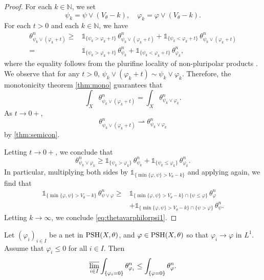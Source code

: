 \begin{proof}
    For each $k\in \mathbb{N}$, we set
    \[
    \psi_k=\psi\lor (V_{\theta}-k),\quad \varphi_k=\varphi\lor (V_{\theta}-k).
    \]
    For each $t>0$ and each $k\in \mathbb{N}$, we have
    \[
    \begin{split}
    \theta_{\psi_k\lor (\varphi_k+t)}^n\geq & \mathds{1}_{\{\psi_k>\varphi_k+t\}}\,\theta_{\psi_k\lor (\varphi_k+t)}^n+\mathds{1}_{\{\psi_k<\varphi_k+t\}}\,\theta_{\psi_k\lor (\varphi _k+t)}^n\\
    =&\mathds{1}_{\{\psi_k>\varphi_k+t\}}\,\theta_{\psi_k}^n+\mathds{1}_{\{\psi_k<\varphi_k+t\}}\,\theta_{\varphi_k}^n,
    \end{split}
    \]
    where the equality follows from the plurifine locality of non-pluripolar products . We observe that for any $t>0$, $\psi_k\lor (\varphi_k+t)\sim \psi_k\lor \varphi_k$. Therefore, the monotonicity theorem \cref{thm:mono} guarantees that
    \[
        \int_X \theta_{\psi_k\lor (\varphi_k+t)}^n=\int_X\theta_{\psi_k\lor \varphi_k}^n.
    \]
    As $t\to 0+$,
    \[
    \theta_{\psi_k\lor (\varphi_k+t)}^n\rightharpoonup \theta_{\psi_k\lor \varphi_k}^n
    \]
    by \cref{thm:semicon}.

    Letting $t\to 0+$, we conclude that
    \[
    \theta_{\psi_k\lor \varphi_k}^n\geq \mathds{1}_{\{\psi_k>\varphi_k\}}\,\theta_{\psi_k}^n+\mathds{1}_{\{\psi_k\leq \varphi_k\}}\,\theta_{\varphi_k}^n.
    \]
    In particular, multiplying both sides by $\mathds{1}_{\{\min\{\varphi,\psi\}>V_{\theta}-k\}}$ and applying  again, we find that
    \[
    \begin{split}
    \mathds{1}_{\{\min\{\varphi,\psi\}>V_{\theta}-k\}}\,\theta_{\psi\lor \varphi}^n\geq &\mathds{1}_{\{\min\{\varphi,\psi\}>V_{\theta}-k\}\cap \{\psi\leq \varphi\}}\,\theta_{\varphi}^n \\
    &+\mathds{1}_{\{\min\{\varphi,\psi\}>V_{\theta}-k\}\cap \{\psi>\varphi\}}\,\theta_{\psi}^n.
    \end{split}
    \]
    Letting $k\to\infty$, we conclude \eqref{eq:thetavarphilorpsi1}.
\end{proof}
\begin{corollary}\label{cor:intcontlimsup}
    Let $(\varphi_i)_{i\in I}$ be a net in $\mathrm{PSH}(X,\theta)$, and $\varphi\in \mathrm{PSH}(X,\theta)$ so that $\varphi_i\to \varphi$ in $L^1$. Assume that $\varphi_i\leq 0$ for all $i\in I$.
    Then
    \begin{equation}\label{eq:contact_int_usc}
    \varlimsup_{i\in I} \int_{\{\varphi_i=0\}}\theta_{\varphi_i}^n\leq \int_{\{\varphi=0\}} \theta_{\varphi}^n.
    \end{equation}
\end{corollary}
